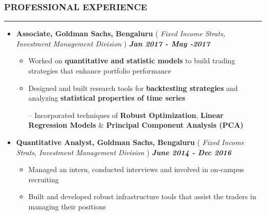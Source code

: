 \documentclass[10pt,a4paper,English]{article}
\newcommand\roottitle[1]{\vspace{-4mm}\subsubsection*{\uppercase{#1}}\vspace{-0.3em}\nopagebreak[4]\hrule}
\newcommand\itemyear[1]{\hfill \textbf{\emph{\color{itemyear} #1}}}
\newcommand\itemenv{\setlength\itemsep{0.5pt} \addtolength{\itemindent}{-5mm}\vspace{-1.5mm}}
\begin{document}
\roottitle{Professional Experience}
\vspace{4mm}
\begin{itemize} \itemenv
    \item \textbf{Associate, Goldman Sachs, Bengaluru} \hfill (\emph{ Fixed Income Strats, Investment Management Division }) \itemyear{Jan 2017 - May -2017}
        \begin{itemize} \itemenv
            \item Worked on \textbf{quantitative and statistic models} to build trading strategies that enhance portfolio performance
            \item Designed and built research tools for \textbf{backtesting strategies} and analyzing \textbf{statistical properties of time series}
            \item[--] Incorporated techniques of \textbf{Robust Optimization}, \textbf{Linear Regression Models} \& \textbf{Principal Component Analysis (PCA)} 
        \end{itemize}
    \item \textbf{Quantitative Analyst, Goldman Sachs, Bengaluru} \hfill (\emph{ Fixed Income Strats, Investment Management Division }) \itemyear{June 2014 - Dec 2016}
        \begin{itemize} \itemenv 
            \item Managed an intern, conducted interviews and involved in on-campus recruiting
            \item Built and developed robust infrastructure tools that assist the traders in managing their positions
        \end{itemize}
\end{itemize}
\end{document}

